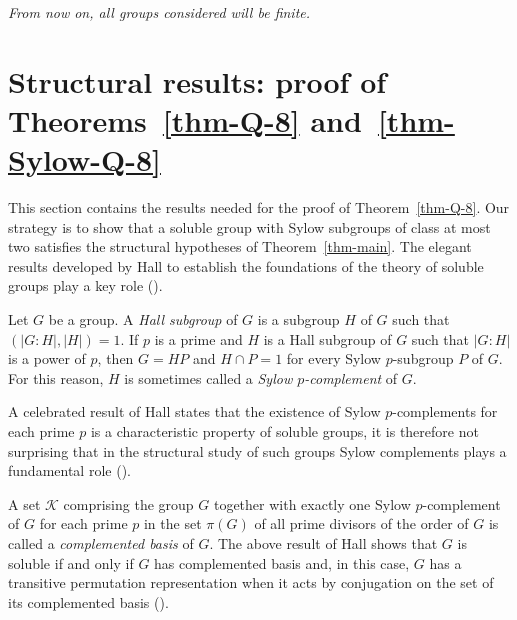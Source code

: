 \documentclass[12pt,a4paper]{article}
\DeclareMathOperator{\C}{C}
\DeclareMathOperator{\Z}{Z}
\DeclareMathOperator{\Ker}{Ker}
\theoremstyle{definition}
\begin{document}


\emph{From now on, all groups considered will be finite.}


\section{Structural results: proof of Theorems~\ref{thm-Q-8} and~\ref{thm-Sylow-Q-8}}

This section contains the results needed for the proof of Theorem~\ref{thm-Q-8}. Our strategy is to show that a soluble group with Sylow subgroups of class at most two satisfies the structural hypotheses of Theorem~\ref{thm-main}. The elegant results developed by Hall to establish the foundations of the theory of soluble groups play a key role (\cite[Chapter~I]{DoerkHawkes1992}).

Let $G$ be a group. A \emph{Hall subgroup} of $G$ is a subgroup $H$ of $G$ such that
$(|G : H|, |H|) = 1$. If $p$ is a prime and $H$ is a Hall subgroup of $G$ such that $|G : H|$ is a power of $p$, then  $G = HP$ and $H \cap P = 1$ for every Sylow $p$-subgroup $P$ of $G$. For this reason, $H$ is sometimes called a \emph{Sylow $p$-complement} of $G$.

A celebrated result of Hall states that the existence of Sylow $p$-complements for each prime $p$ is a characteristic property of soluble groups, it is therefore not surprising that in the structural study of such groups Sylow complements plays a fundamental role (\cite[Theorems~I.3.3 and~I.3.5]{DoerkHawkes1992}).


A set $\mathcal{K}$ comprising the group $G$ together with exactly one Sylow $p$-complement of $G$ for each prime $p$ in the set $\pi(G)$ of all prime divisors of the order of $G$ is called a \emph{complemented basis} of $G$. The above result of Hall shows that $G$ is soluble if and only if $G$ has complemented basis and, in this case, $G$ has a transitive permutation representation when it acts by conjugation on the set of its complemented basis (\cite[Theorems~I.4.10 and~4.11]{DoerkHawkes1992}).
\end{document}
